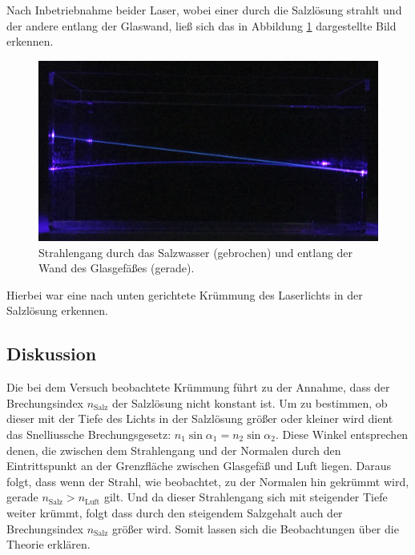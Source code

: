 		Nach Inbetriebnahme beider Laser, wobei einer durch die Salzlösung strahlt und der andere entlang der Glaswand, ließ sich das in Abbildung \ref{fig:Beobachtung1} dargestellte Bild erkennen.
		\begin{figure}[ht]
			\centering
			\includegraphics[width=\textwidth]{bilder/beobachtung1.jpg}
			\caption{Strahlengang durch das Salzwasser (gebrochen) und entlang der Wand des Glasgefäßes (gerade).\cite{WWU}}
			\label{fig:Beobachtung1}	
		\end{figure}
		Hierbei war eine nach unten gerichtete Krümmung des Laserlichts in der Salzlösung erkennen. 
		
	\subsection{Diskussion}
		
		Die bei dem Versuch beobachtete Krümmung führt zu der Annahme, dass der Brechungsindex  $n_\text{Salz}$ der Salzlösung nicht konstant ist.
		Um zu bestimmen, ob dieser mit der Tiefe des Lichts in der Salzlösung größer oder kleiner wird dient das Snelliussche Brechungsgesetz: $n_1\sin{\alpha_1} = n_2\sin{\alpha_2}$.
		Diese Winkel entsprechen denen, die zwischen dem Strahlengang und der Normalen durch den Eintrittspunkt an der Grenzfläche zwischen Glasgefäß und Luft liegen.
		Daraus folgt, dass wenn der Strahl, wie beobachtet, zu der Normalen hin gekrümmt wird, gerade $n_\text{Salz} > n_\text{Luft}$ gilt.
		Und da dieser Strahlengang sich mit steigender Tiefe weiter krümmt, folgt dass durch den steigendem Salzgehalt auch der Brechungsindex $n_\text{Salz}$ größer wird.
		Somit lassen sich die Beobachtungen über die Theorie erklären.
